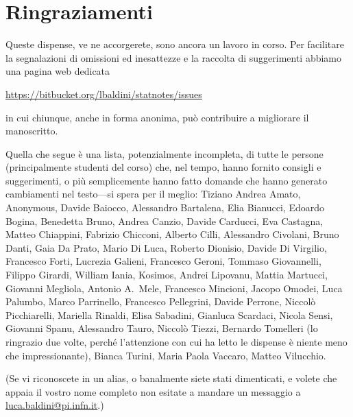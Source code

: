 \chapter*{Ringraziamenti}

Queste dispense, ve ne accorgerete, sono ancora un lavoro in corso.
Per facilitare la segnalazioni di omissioni ed inesattezze e la raccolta di
suggerimenti abbiamo una pagina web dedicata
\begin{center}
  \url{https://bitbucket.org/lbaldini/statnotes/issues}
\end{center}
in cui chiunque, anche in forma anonima, può contribuire a migliorare il
manoscritto.

Quella che segue è una lista, potenzialmente incompleta, di tutte le persone
(principalmente studenti del corso) che, nel tempo, hanno fornito consigli e
suggerimenti, o più semplicemente hanno fatto domande che hanno generato
cambiamenti nel testo---si spera per il meglio:
Tiziano Andrea Amato,
Anonymous,
Davide Baiocco,
Alessandro Bartalena,
Elia Bianucci,
Edoardo Bogina,
Benedetta Bruno,
Andrea Canzio,
Davide Carducci,
Eva Castagna,
Matteo Chiappini,
Fabrizio Chicconi,
Alberto Cilli,
Alessandro Civolani,
Bruno Danti,
Gaia Da Prato,
Mario Di Luca,
Roberto Dionisio,
Davide Di Virgilio,
Francesco Forti,
Lucrezia Galieni,
Francesco Geroni,
Tommaso Giovannelli,
Filippo Girardi,
William Iania,
Kosimos,
Andrei Lipovanu,
Mattia Martucci,
Giovanni Megliola,
Antonio A.~Mele,
Francesco Mincioni,
Jacopo Omodei,
Luca Palumbo,
Marco Parrinello,
Francesco Pellegrini,
Davide Perrone,
Niccolò Picchiarelli,
Mariella Rinaldi,
Elisa Sabadini,
Gianluca Scardaci,
Nicola Sensi,
Giovanni Spanu,
Alessandro Tauro,
Niccolò Tiezzi,
Bernardo Tomelleri (lo ringrazio due volte, perché l'attenzione con cui ha
letto le dispense è niente meno che impressionante),
Bianca Turini,
Maria Paola Vaccaro,
Matteo Vilucchio.

\bigskip

(Se vi riconoscete in un alias, o banalmente siete stati dimenticati, e volete
che appaia il vostro nome completo non esitate a mandare un messaggio a
\href{mailto:luca.baldini@pi.infn.it}{luca.baldini@pi.infn.it}.)
